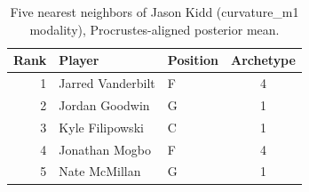 \begin{table}[htbp]
  \centering\small
  \begin{tabular}{rllc}
    \toprule
    Rank & Player & Position & Archetype \\
    \midrule
    1 & Jarred Vanderbilt & F & 4 \\
    2 & Jordan Goodwin & G & 1 \\
    3 & Kyle Filipowski & C & 1 \\
    4 & Jonathan Mogbo & F & 4 \\
    5 & Nate McMillan & G & 1 \\
    \bottomrule
  \end{tabular}
  \caption{Five nearest neighbors of Jason Kidd (curvature_m1 modality), Procrustes-aligned posterior mean.}
  \label{tab:Jason_Kidd_neighbors_curvature_m1}
\end{table}

